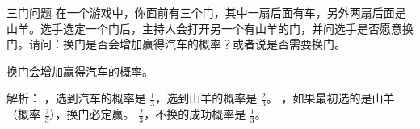 \begin{example}{三门问题}
在一个游戏中，你面前有三个门，其中一扇后面有车，另外两扇后面是山羊。选手选定一个门后，主持人会打开另一个有山羊的门，并问选手是否愿意换门。请问：换门是否会增加赢得汽车的概率？或者说是否需要换门。
\end{example}

换门会增加赢得汽车的概率。


解析：
，选到汽车的概率是 $\frac{1}{3}$，选到山羊的概率是 $\frac{2}{3}$。
，如果最初选的是山羊（概率 $\frac{2}{3}$），换门必定赢。
 $\frac{2}{3}$，不换的成功概率是 $\frac{1}{3}$。